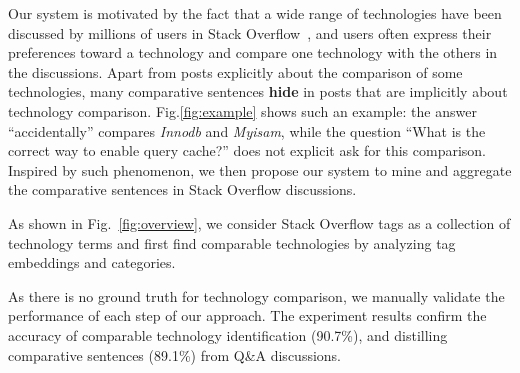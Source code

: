 Our system is motivated by the fact that a wide range of technologies have been discussed by millions of users in Stack Overflow~\cite{chen2016towards}, and users often express their preferences toward a technology and compare one technology with the others in the discussions.
Apart from posts explicitly about the comparison of some technologies, many comparative sentences \textbf{hide} in posts that are implicitly about technology comparison.
Fig.\ref{fig:example} shows such an example: the answer ``accidentally'' compares \textit{Innodb} and \textit{Myisam}, while the question ``What is the correct way to enable query cache?'' does not explicit ask for this comparison.
Inspired by such phenomenon, we then propose our system to mine and aggregate the comparative sentences in Stack Overflow discussions.

As shown in Fig.~\ref{fig:overview}, we consider Stack Overflow tags as a collection of technology terms and first find comparable technologies by analyzing tag embeddings and categories.


As there is no ground truth for technology comparison, we manually validate the performance of each step of our approach. 
The experiment results confirm the accuracy of comparable technology identification (90.7\%), and distilling comparative sentences (89.1\%) from Q\&A discussions.


